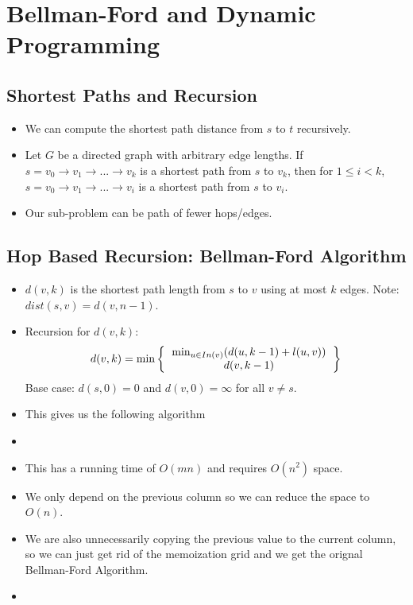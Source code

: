 \section{Bellman-Ford and Dynamic Programming}

\subsection{Shortest Paths and Recursion}
\begin{itemize}
    \item We can compute the shortest path distance from $s$ to $t$ recursively.
    \item Let $G$ be a directed graph with arbitrary edge lengths. If $s = v_0 \rightarrow v_1 \rightarrow ... \rightarrow v_k$ is a shortest path from $s$ to $v_k$, then for $1 \leq i < k$, $s = v_0 \rightarrow v_1 \rightarrow ... \rightarrow v_i$ is a shortest path from $s$ to $v_i$.
    \item Our sub-problem can be path of fewer hops/edges.
\end{itemize}

\subsection{Hop Based Recursion: Bellman-Ford Algorithm}
\begin{itemize}
    \item $d(v, k)$ is the shortest path length from $s$ to $v$ using at most $k$ edges. Note: $dist(s, v) = d(v, n - 1)$.
    \item Recursion for $d(v, k)$: \begin{equation}
        d(v, k) = \min \left\{
            \begin{tabular}{c}
                $\min_{u \in In(v)}(d(u, k - 1) + l(u, v))$ \\
                $d(v, k - 1)$ \\
            \end{tabular}
        \right\}
    \end{equation}
    Base case: $d(s, 0) = 0$ and $d(v, 0) = \infty$ for all $v \neq s$.
    \item This gives us the following algorithm
    \item[] 
    \item This has a running time of $O(mn)$ and requires $O(n^2)$ space.
    \item We only depend on the previous column so we can reduce the space to $O(n)$.
    \item We are also unnecessarily copying the previous value to the current column, so we can just get rid of the memoization grid and we get the orignal Bellman-Ford Algorithm.
    \item[] 
\end{itemize}


